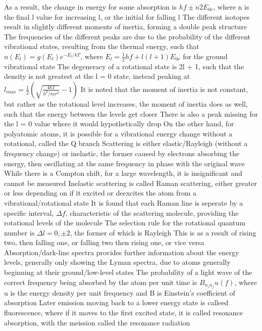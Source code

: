 \documentclass[11 pt, twoside]{article}
\newenvironment{outline*}
{
	\begin{outline}[enumerate]
	}
	{\end{outline}
}
\begin{document}
\begin{outline*}
		\3 As a result, the change in energy for some absorption is $hf \pm n2E_{0r}$, where n is the final l value for increasing l, or the initial for falling l
		\3 The different isotopes result in slightly different moments of inertia, forming a double peak structure
		\3 The frequencies of the different peaks are due to the probability of the different vibrational states, resulting from the thermal energy, such that $n(E_l) = g(E_l)e^{-E_l/kT}$, where $E_l = \frac{1}{2}hf + l(l+1)E_{0r}$ for the ground vibrational state
			\4 The degeneracy of a rotational state is 2l + 1, such that the density is not greatest at the l = 0 state, instead peaking at $l_{max} = \frac{1}{2}(\sqrt{\frac{4kT}{h^2/mr^2}} - 1)$
		\3 It is noted that the moment of inertia is not constant, but rather as the rotational level increases, the moment of inertia does as well, such that the energy between the levels get closer
			\4 There is also a peak missing for the l = 0 value where it would hypothetically drop
			\4 On the other hand, for polyatomic atoms, it is possible for a vibrational energy change without a rotational, called the Q branch
\1 Scattering is either elastic/Rayleigh (without a frequency change) or inelastic, the former caused by electrons absorbing the energy, then oscillating at the same frequency in phase with the original wave
	\2 While there is a Compton shift, for a large wavelength, it is insignificant and cannot be measured
	\2 Inelastic scattering is called Raman scattering, either greater or less depending on if it excited or deexcites the atom from a vibrational/rotational state
		\3 It is found that each Raman line is seperate by a specific interval, $\Delta f$, characteristic of the scattering molecule, providing the rotational levels of the molecule
		\3 The selection rule for the rotational quantum number is $\Delta l = 0, \pm 2$, the former of which is Rayleigh
			\4 This is as a result of rising two, then falling one, or falling two then rising one, or vice versa
	\2 Absorption/dark-line spectra provides further information about the energy levels, generally only showing the Lyman spectra, due to atoms generally beginning at their ground/low-level states
		\3 The probability of a light wave of the correct frequency being absorbed by the atom per unit time is $B_{n_in_f}u(f)$, where u is the energy density per unit frequency and B is Einstein's coefficient of absorption
		\3 Later emission moving back to a lower energy state is calleed fluorescence, where if it moves to the first excited state, it is called resonance absorption, with the meission called the resonance radiation

\end{outline*}
\end{document}
